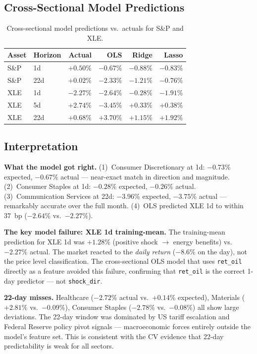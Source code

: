 \documentclass[11pt,a4paper]{article}
\begin{document}
\subsection{Cross-Sectional Model Predictions}

\begin{table}[H]
\centering
\caption{Cross-sectional model predictions vs.\ actuals for S\&P and XLE.}
\label{tab:2026models}
\begin{tabular}{llrrrr}
\toprule
Asset & Horizon & Actual & OLS & Ridge & Lasso \\
\midrule
S\&P & 1d  & $+0.50\%$ & $-0.67\%$ & $-0.88\%$ & $-0.83\%$ \\
S\&P & 22d & $+0.02\%$ & $-2.33\%$ & $-1.21\%$ & $-0.76\%$ \\
\midrule
XLE & 1d  & $-2.27\%$ & $\mathbf{-2.64\%}$ & $-0.28\%$ & $-1.91\%$ \\
XLE & 5d  & $+2.74\%$ & $-3.45\%$ & $+0.33\%$ & $+0.38\%$ \\
XLE & 22d & $+0.68\%$ & $+3.70\%$ & $+1.15\%$ & $+1.92\%$ \\
\bottomrule
\end{tabular}
\end{table}

\subsection{Interpretation}

\textbf{What the model got right.} (1)~Consumer Discretionary at 1d: $-0.73\%$ expected, $-0.67\%$ actual — near-exact match in direction and magnitude. (2)~Consumer Staples at 1d: $-0.28\%$ expected, $-0.26\%$ actual. (3)~Communication Services at 22d: $-3.96\%$ expected, $-3.75\%$ actual — remarkably accurate over the full month. (4)~OLS predicted XLE 1d to within 37~bp ($-2.64\%$ vs.\ $-2.27\%$).

\textbf{The key model failure: XLE 1d training-mean.} The training-mean prediction for XLE 1d was $+1.28\%$ (positive shock $\to$ energy benefits) vs.\ $-2.27\%$ actual. The market reacted to the \emph{daily return} ($-8.6\%$ on the day), not the price level classification. The cross-sectional OLS model that uses \texttt{ret\_oil} directly as a feature avoided this failure, confirming that \texttt{ret\_oil} is the correct 1-day predictor — not \texttt{shock\_dir}.

\textbf{22-day misses.} Healthcare ($-2.72\%$ actual vs.\ $+0.14\%$ expected), Materials ($+2.81\%$ vs.\ $-0.09\%$), Consumer Staples ($-2.78\%$ vs.\ $-0.08\%$) all show large deviations. The 22-day window was dominated by US tariff escalation and Federal Reserve policy pivot signals — macroeconomic forces entirely outside the model's feature set. This is consistent with the CV evidence that 22-day predictability is weak for all sectors.
\end{document}
